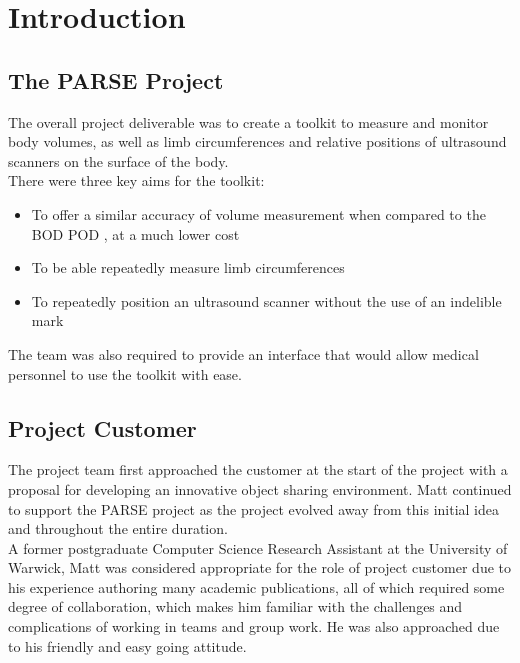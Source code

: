 \chapter{Introduction}
\label{specification}
\setcounter{page}{1}

\section{The PARSE Project}
The overall project deliverable was to create a toolkit to measure and monitor body volumes, as well as limb circumferences and relative positions of ultrasound scanners on the surface of the body.\\ 

There were three key aims for the toolkit:\begin{itemize}
\item To offer a similar accuracy of volume measurement when compared to the BOD POD \cite{cosmed2013}, at a much lower cost 
\item To be able repeatedly measure limb circumferences 
\item To repeatedly position an ultrasound scanner without the use of an indelible mark\end{itemize}

The team was also required to provide an interface that would allow medical personnel to use the toolkit with ease.



\section{Project Customer}
The project team first approached the customer at the start of the project with a proposal for developing an innovative object sharing environment. Matt continued to support the PARSE project as the project evolved away from this initial idea and throughout the entire duration.\\ 

A former postgraduate Computer Science Research Assistant at the University of Warwick, Matt was considered appropriate for the role of project customer due to his experience authoring many academic publications, all of which required some degree of collaboration, which makes him familiar with the challenges and complications of working in teams and group work. He was also approached due to his friendly and easy going attitude.\\

